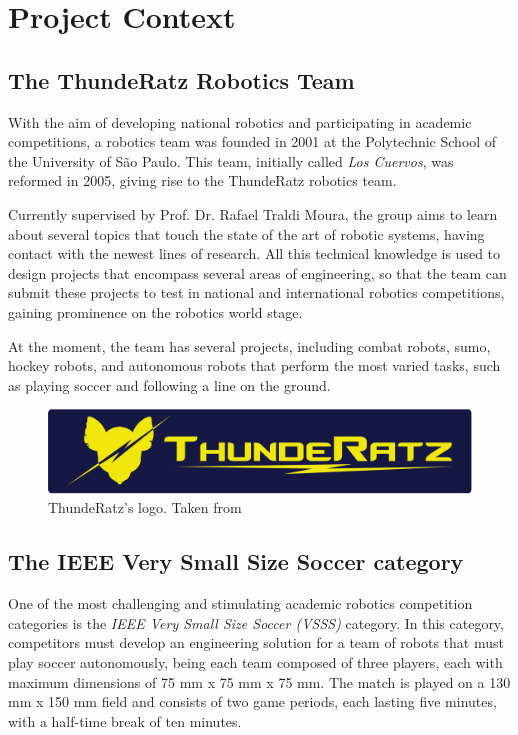 \section{Project Context}

\subsection{The ThundeRatz Robotics Team}

With the aim of developing national robotics and participating in academic competitions, a robotics team was founded in 2001 at the Polytechnic School of the University of São Paulo. This team, initially called \textit{Los Cuervos}, was reformed in 2005, giving rise to the ThundeRatz \cite{ThundeRatz} robotics team.

Currently supervised by Prof. Dr. Rafael Traldi Moura, the group aims to learn about several topics that touch the state of the art of robotic systems, having contact with the newest lines of research. All this technical knowledge is used to design projects that encompass several areas of engineering, so that the team can submit these projects to test in national and international robotics competitions, gaining prominence on the robotics world stage.

At the moment, the team has several projects, including combat robots, sumo, hockey robots, and autonomous robots that perform the most varied tasks, such as playing soccer and following a line on the ground.

\begin{figure}[!h]
    \centering
    \includegraphics[width=.6\linewidth]{chapters/introduction/images/ThundeRatz Logo.png}
    \caption{ThundeRatz's logo. Taken from \cite{ThundeRatz}}
\end{figure}

\subsection{The IEEE Very Small Size Soccer category}

One of the most challenging and stimulating academic robotics competition categories is the \textit{IEEE Very Small Size Soccer (VSSS)} category. In this category, competitors must develop an engineering solution for a team of robots that must play soccer autonomously, being each team composed of three players, each with maximum dimensions of 75 mm x 75 mm x 75 mm. The match is played on a 130 mm x 150 mm field and consists of two game periods, each lasting five minutes, with a half-time break of ten minutes.

